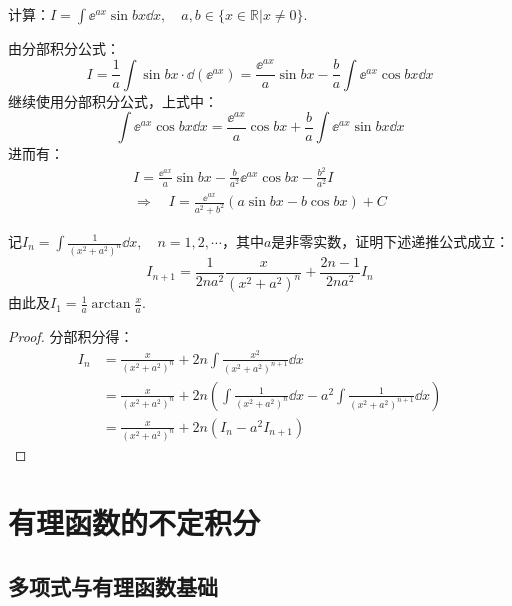 \begin{question}
    计算：$\displaystyle I = \int \ee^{ax} \sin bx \dd{x},\quad a,b\in \{x \in \mathbb{R} | x\neq 0\}$.
\end{question}

\begin{solution}
    由分部积分公式：
    \[I = \frac{1}{a}\int\sin bx \cdot \dd{(\ee^{ax})} = \frac{\ee^{ax}}{a}\sin bx - \frac{b}{a}\int \ee^{ax}\cos bx \dd{x}\]
    继续使用分部积分公式，上式中：
    \[\int \ee^{ax}\cos bx \dd{x} = \frac{\ee^{ax}}{a}\cos bx + \frac{b}{a}\int \ee^{ax} \sin bx \dd{x}\]
    进而有：
    \begin{gather*}
        I = \frac{\ee^{ax}}{a}\sin bx - \frac{b}{a^2} \ee^{ax} \cos bx - \frac{b^2}{a^2}I\\
        \Rightarrow\quad I = \frac{\ee^{ax}}{a^2+b^2}(a\sin bx - b\cos bx) + C
    \end{gather*}
\end{solution}

\begin{question}
    记$\displaystyle I_n = \int\frac{1}{(x^2+a^2)^n}\dd{x},\quad n =1,2,\cdots$，其中$a$是非零实数，证明下述递推公式成立：
    \[I_{n+1} = \frac{1}{2na^2}\frac{x}{(x^2+a^2)^n} + \frac{2n-1}{2na^2} I_n\]
    由此及$\displaystyle I_1 = \frac{1}{a}\arctan\frac{x}{a}$.
\end{question}

\begin{proof}
    分部积分得：
    \begin{align*}
        I_n &= \frac{x}{(x^2+a^2)^n} + 2n \int\frac{x^2}{(x^2+a^2)^{n+1}}\dd{x} \\
        &= \frac{x}{(x^2+a^2)^n} + 2n\left(\int\frac{1}{(x^2+a^2)^n}\dd{x} - a^2 \int\frac{1}{(x^2+a^2)^{n+1}}\dd{x}\right)\\
        &= \frac{x}{(x^2+a^2)^n} + 2n(I_n - a^2 I_{n+1})
    \end{align*}
\end{proof}


\section{有理函数的不定积分}
\subsection{多项式与有理函数基础}
